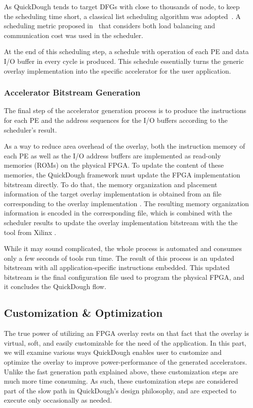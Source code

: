 As QuickDough tends to target DFGs with close to thousands of node, to keep the scheduling time short, a classical list scheduling algorithm was adopted~\cite{schutten1996list}.
A scheduling metric proposed in~\cite{Lin:2012:EDC:2460216.2460227} that considers both load balancing and communication cost was used in the scheduler.

At the end of this scheduling step, a schedule with operation of each PE and data I/O buffer in every cycle is produced.
This schedule essentially turns the generic overlay implementation into the specific accelerator for the user application.


\subsubsection{Accelerator Bitstream Generation}
The final step of the accelerator generation process is to produce the instructions for each PE and the address sequences for the I/O buffers according to the scheduler's result.

As a way to reduce area overhead of the overlay, both the instruction memory of each PE as well as the I/O address buffers are implemented as read-only memories (ROMs) on the physical FPGA.
To update the content of these memories, the QuickDough framework must update the FPGA implementation bitstream directly.
%
To do that, the memory organization and placement information of the target overlay implementation is obtained from an  file corresponding to the overlay implementation \cite{beckhoff2011xilinx}.
The resulting memory organization information is encoded in the corresponding  file, which is combined with the scheduler results to update the overlay implementation bitstream with the the  tool from Xilinx \cite{data2mem}.

While it may sound complicated, the whole process is automated and consumes only a few seconds of tools run time.
The result of this process is an updated bitstream with all application-specific instructions embedded.
This updated bitstream is the final configuration file used to program the physical FPGA, and it concludes the QuickDough flow.


\subsection{Customization \& Optimization}
The true power of utilizing an FPGA overlay rests on that fact that the overlay is virtual, soft, and easily customizable for the need of the application.
In this part, we will examine various ways QuickDough enables user to customize and optimize the overlay to improve power-performance of the generated accelerators.
Unlike the fast generation path explained above, these customization steps are much more time consuming.
As such, these customization steps are considered part of the slow path in QuickDough's design philosophy, and are expected to execute only occasionally as needed.

